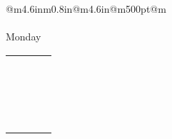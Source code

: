 \documentclass[10pt]{article}
\begin{document}
\begin{table}
\begin{tabular*}{@{}m{4.6in}m{0.8in}@{}m{4.6in}@{}m{500pt}@{}m{\extracolsep{\fill}}}
 \\ \vspace{5pt} \\ \Large Monday \\ \vspace{05pt}
\begin{tabular}{|c|c|c|c|}
\hline
\raisebox{-.5 \height}{{\scriptsize 6}{\tiny \,AM }} & \\ \hline
\raisebox{-.5 \height}{{\scriptsize 7}{\tiny \,AM }} & \\ \hline
\raisebox{-.5 \height}{{\scriptsize 8}{\tiny \,AM }} & \\ \hline
\raisebox{-.5 \height}{{\scriptsize 9}{\tiny \,AM }} & \\ \hline
\raisebox{-.5 \height}{{\scriptsize 10}{\tiny \,AM }} & \\ \hline
\raisebox{-.5 \height}{{\scriptsize 11}{\tiny \,AM }} & \\ \hline
\raisebox{-.5 \height}{{\scriptsize 12}{\tiny \,AM }} & \\ \hline
\raisebox{-.5 \height}{{\scriptsize 1}{\tiny \,AM }} & \\ \hline
\raisebox{-.5 \height}{{\scriptsize 2}{\tiny \,AM }} & \\ \hline
\raisebox{-.5 \height}{{\scriptsize 3}{\tiny \,AM }} & \\ \hline
\raisebox{-.5 \height}{{\scriptsize 4}{\tiny \,AM }} & \\ \hline
\raisebox{-.5 \height}{{\scriptsize 5}{\tiny \,AM }} & \\ \hline
\raisebox{-.5 \height}{{\scriptsize 6}{\tiny \,AM }} & \\ \hline
\raisebox{-.5 \height}{{\scriptsize 7}{\tiny \,AM }} & \\ \hline
\raisebox{-.5 \height}{{\scriptsize 8}{\tiny \,AM }} & \\ \hline
\raisebox{-.5 \height}{{\scriptsize 9}{\tiny \,AM }} & \\ \hline
\raisebox{-.5 \height}{{\scriptsize 10}{\tiny \,AM }} & \\ \hline
\raisebox{-.5 \height}{{\scriptsize 11}{\tiny \,AM }} & \\ \hline
\raisebox{-.5 \height}{{\scriptsize 12}{\tiny \,AM }} & \\ \hline

\end{tabular}
\end{tabular*}\vspace{05pt}
\end{table}
\end{document}
